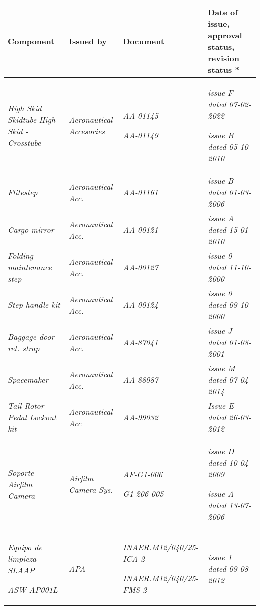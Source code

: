 \documentclass[
]{article}
\begin{document}
\begin{longtable}[]{@{}|
  >{\raggedright\arraybackslash}p{}|
  >{\raggedright\arraybackslash}p{}|
  >{\raggedright\arraybackslash}p{}|
  >{\raggedright\arraybackslash}p{}|@{}}

\bottomrule\noalign{}
\hline
\textbf{Component} & \textbf{Issued by} & \textbf{Document} & \textbf{Date of issue, approval status, revision status *} \\
\hline
\emph{High Skid -- Skidtube}
\emph{High Skid - Crosstube} & \emph{Aeronautical Accesories} &
\emph{AA-01145}

\emph{AA-01149} & \emph{issue F dated 07-02-2022}

\emph{issue B dated 05-10-2010} \\
\hline
\emph{Flitestep} & \emph{Aeronautical Acc.} & \emph{AA-01161} &
\emph{issue B dated 01-03-2006} \\
\hline
\emph{Cargo mirror} & \emph{Aeronautical Acc.} & \emph{AA-00121} &
\emph{issue A dated 15-01-2010} \\
\hline
\emph{Folding maintenance step} & \emph{Aeronautical Acc.} &
\emph{AA-00127} & \emph{issue 0 dated 11-10-2000} \\
\hline
\emph{Step handle kit} & \emph{Aeronautical Acc.} & \emph{AA-00124} &
\emph{issue 0 dated 09-10-2000} \\
\hline
\emph{Baggage door ret. strap} & \emph{Aeronautical Acc.} &
\emph{AA-87041} & \emph{issue J dated 01-08-2001} \\
\hline
\emph{Spacemaker} & \emph{Aeronautical Acc.} & \emph{AA-88087} &
\emph{issue M dated 07-04-2014} \\
\hline
\emph{Tail Rotor Pedal Lockout kit} & \emph{Aeronautical Acc} &
\emph{AA-99032} & \emph{Issue E dated 26-03-2012} \\
\hline
\emph{Soporte Airfilm Camera} & \emph{Airfilm Camera Sys.} &
\emph{AF-G1-006}

\emph{G1-206-005} & \emph{issue D dated 10-04-2009}

\emph{issue A dated 13-07-2006} \\
\hline
\emph{Equipo de limpieza SLAAP}

\emph{ASW-AP001L} & \emph{APA} & \emph{INAER.M12/040/25-ICA-2}

\emph{INAER.M12/040/25-FMS-2} & \emph{issue 1 dated 09-08-2012}


\end{longtable}
\end{document}
